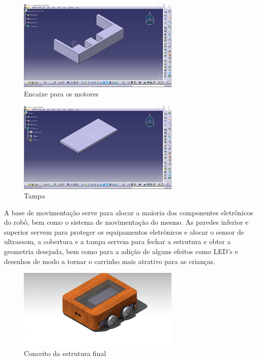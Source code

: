 \begin{figure}[H]
    \centering
    \includegraphics[width=0.7\textwidth]{figuras/en_motor.eps}
    \caption{Encaixe para os motores}
    \label{fig:en_motor}
\end{figure}

\begin{figure}[H]
    \centering
    \includegraphics[width=0.7\textwidth]{figuras/tampa.eps}
    \caption{Tampa}
    \label{fig:tampa}
\end{figure}

A base de movimentação serve para alocar a maioria dos componentes eletrônicos do robô, bem como o sistema de movimentação do
mesmo. As paredes inferior e superior servem para proteger os equipamentos eletrônicos e alocar o sensor de ultrassom, a cobertura
e a tampa servem para fechar a estrutura e obter a geometria desejada, bem como para a adição de alguns efeitos como LED’s e desenhos
de modo a tornar o carrinho mais atrativo para as crianças.

\begin{figure}[H]
    \centering
    \includegraphics[width=0.7\textwidth]{figuras/alfa_concept.eps}
    \caption{Conceito da estrutura final}
    \label{fig:alfa_concept}
\end{figure}

